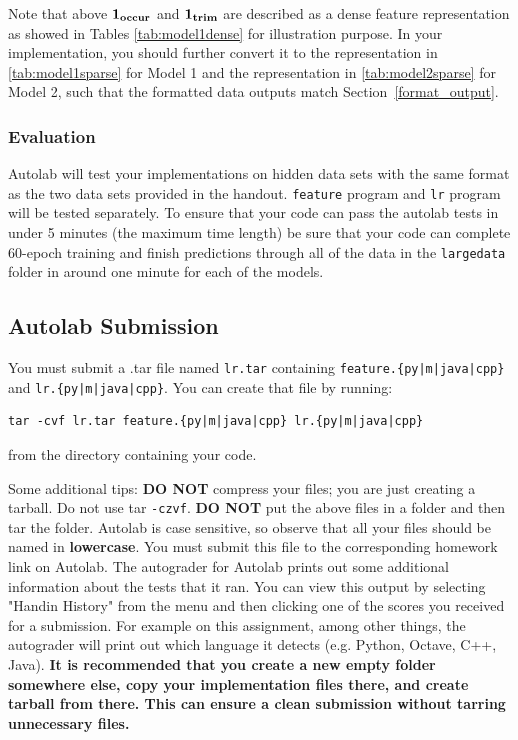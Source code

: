 Note that above $\bf{1}_{occur}$ and $\bf{1}_{trim}$ are described as a dense feature representation as showed in Tables \ref{tab:model1dense} for illustration purpose. In your implementation, you should further convert it to the representation in \ref{tab:model1sparse} for Model 1 and the representation in \ref{tab:model2sparse} for Model 2, such that the formatted data outputs match Section~\ref{format_output}.



\subsubsection{Evaluation}

Autolab will test your implementations on hidden data sets with the same format as the two data sets provided in the handout. \lstinline{feature} program and \lstinline{lr} program will be tested separately. To ensure that your code can pass the autolab tests in under 5 minutes (the maximum time length) be sure that your code can complete 60-epoch training and finish predictions through all of the data in the \lstinline{largedata} folder in around one minute for each of the models.


\subsection{Autolab Submission}

You must submit a .tar file named {\tt lr.tar} containing \texttt{feature.\{py|m|java|cpp\}} and \newline \texttt{lr.\{py|m|java|cpp\}}.
You can create that file by running:
\begin{lstlisting}
tar -cvf lr.tar feature.{py|m|java|cpp} lr.{py|m|java|cpp}
\end{lstlisting}
from the directory containing your code. 

Some additional tips: {\bf DO NOT} compress your files; you are just
creating a tarball. Do not use tar \texttt{-czvf}.  {\bf DO NOT} put
the above files in a folder and then tar the folder.  Autolab is case
sensitive, so observe that all your files should be named in {\bf
  lowercase}. You must submit this file to the corresponding homework
link on Autolab. The autograder for Autolab prints out some additional 
information about the tests that it ran. You can view this output by selecting 
 "Handin History" from the menu and then clicking one of the scores you 
 received for a submission. For example on this assignment, among other things, 
 the autograder will print out which language it detects (e.g. Python, Octave, C++, Java).  {\bf It is recommended that you create a new empty folder somewhere else, copy your implementation files there, and create tarball from there. This can ensure a clean submission without tarring unnecessary files.}
 
